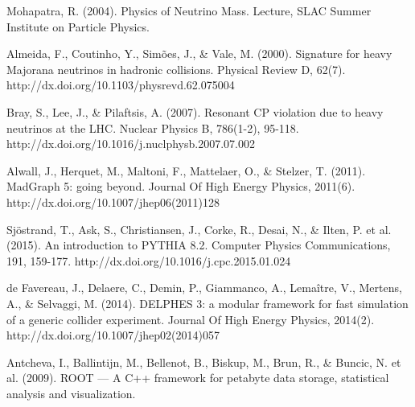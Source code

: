 \documentclass[11pt]{book}
\begin{document}
\begin{thebibliography}{10}
 Mohapatra, R. (2004). Physics of Neutrino Mass. Lecture, SLAC Summer Institute on Particle Physics.

 Almeida, F., Coutinho, Y., Simões, J., \& Vale, M. (2000). Signature for heavy Majorana neutrinos in hadronic collisions. Physical Review D, 62(7). http://dx.doi.org/10.1103/physrevd.62.075004

Bray, S., Lee, J., \& Pilaftsis, A. (2007). Resonant CP violation due to heavy neutrinos at the LHC. Nuclear Physics B, 786(1-2), 95-118. http://dx.doi.org/10.1016/j.nuclphysb.2007.07.002

 Alwall, J., Herquet, M., Maltoni, F., Mattelaer, O., \& Stelzer, T. (2011). MadGraph 5: going beyond. Journal Of High Energy Physics, 2011(6). http://dx.doi.org/10.1007/jhep06(2011)128

Sjöstrand, T., Ask, S., Christiansen, J., Corke, R., Desai, N., \& Ilten, P. et al. (2015). An introduction to PYTHIA 8.2. Computer Physics Communications, 191, 159-177. http://dx.doi.org/10.1016/j.cpc.2015.01.024

 de Favereau, J., Delaere, C., Demin, P., Giammanco, A., Lemaître, V., Mertens, A., \& Selvaggi, M. (2014). DELPHES 3: a modular framework for fast simulation of a generic collider experiment. Journal Of High Energy Physics, 2014(2). http://dx.doi.org/10.1007/jhep02(2014)057

 Antcheva, I., Ballintijn, M., Bellenot, B., Biskup, M., Brun, R., \& Buncic, N. et al. (2009). ROOT — A C++ framework for petabyte data storage, statistical analysis and visualization.

\end{thebibliography}
\end{document}
